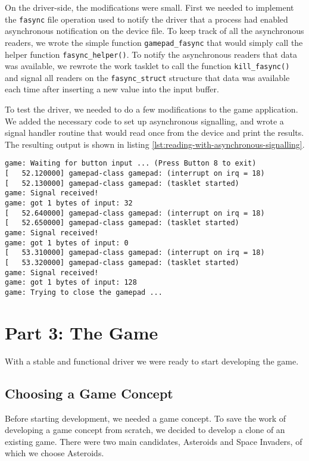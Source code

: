 On the driver-side, the modifications were small. First we needed to implement the \texttt{fasync} file operation used to notify the driver that a process had enabled asynchronous notification on the device file. To keep track of all the asynchronous readers, we wrote the simple function \texttt{gamepad\_fasync} that would simply call the helper function \texttt{fasync\_helper()}. To notify the asynchronous readers that data was available, we rewrote the work tasklet to call the function \texttt{kill\_fasync()} and signal all readers on the \texttt{fasync\_struct} structure that data was available each time after inserting a new value into the input buffer.

To test the driver, we needed to do a few modifications to the game application. We added the necessary code to set up asynchronous signalling, and wrote a signal handler routine that would read once from the device and print the results. The resulting output is shown in listing \ref{lst:reading-with-asynchronous-signalling}.
\begin{lstlisting}[caption=Reading with asynchronous signalling.,label=lst:reading-with-asynchronous-signalling]
game: Waiting for button input ... (Press Button 8 to exit)
[   52.120000] gamepad-class gamepad: (interrupt on irq = 18)
[   52.130000] gamepad-class gamepad: (tasklet started)
game: Signal received!
game: got 1 bytes of input: 32
[   52.640000] gamepad-class gamepad: (interrupt on irq = 18)
[   52.650000] gamepad-class gamepad: (tasklet started)
game: Signal received!
game: got 1 bytes of input: 0
[   53.310000] gamepad-class gamepad: (interrupt on irq = 18)
[   53.320000] gamepad-class gamepad: (tasklet started)
game: Signal received!
game: got 1 bytes of input: 128
game: Trying to close the gamepad ...
\end{lstlisting}



\section{Part 3: The Game}
With a stable and functional driver we were ready to start developing the game.

\subsection{Choosing a Game Concept}
Before starting development, we needed a game concept. To save the work of developing a game concept from scratch, we decided to develop a clone of an existing game. There were two main candidates, Asteroids and Space Invaders, of which we choose Asteroids.

